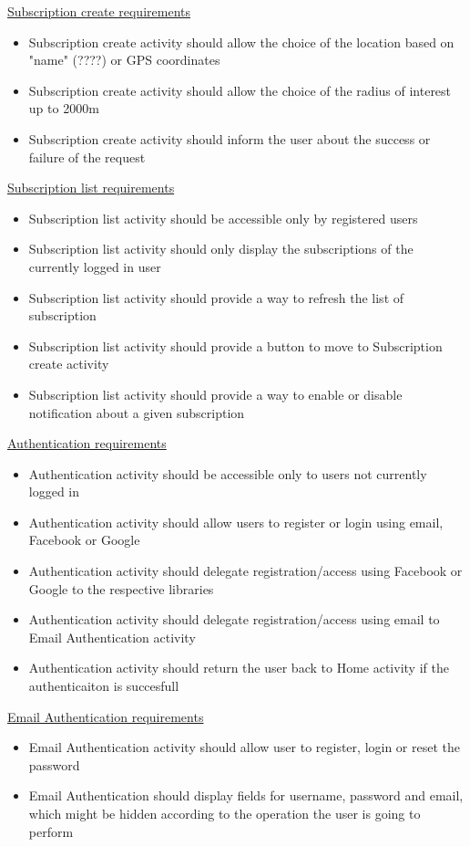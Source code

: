 \documentclass[a4paper]{scrreprt}
\begin{document}
\par \underline{Subscription create requirements}
\begin{itemize}
\item Subscription create activity should allow the choice of the location based on "name" (????) or GPS coordinates
\item Subscription create activity should allow the choice of the radius of interest up to 2000m
\item Subscription create activity should inform the user about the success or failure of the request
\end{itemize}

\par \underline{Subscription list requirements}
\begin{itemize}
\item Subscription list activity should be accessible only by registered users
\item Subscription list activity should only display the subscriptions of the currently logged in user
\item Subscription list activity should provide a way to refresh the list of subscription
\item Subscription list activity should provide a button to move to Subscription create activity
\item Subscription list activity should provide a way to enable or disable notification about a given subscription
\end{itemize}

\par \underline{Authentication requirements}
\begin{itemize}
\item Authentication activity should be accessible only to users not currently logged in
\item Authentication activity should allow users to register or login using email, Facebook or Google
\item Authentication activity should delegate registration/access using Facebook or Google to the respective libraries
\item Authentication activity should delegate registration/access using email to Email Authentication activity
\item Authentication activity should return the user back to Home activity if the authenticaiton is succesfull
\end{itemize}

\par \underline{Email Authentication requirements}
\begin{itemize}
\item Email Authentication activity should allow user to register, login or reset the password
\item Email Authentication should display fields for username, password and email, which might be hidden according to the operation the user is going to perform
\end{itemize}
\end{document}

